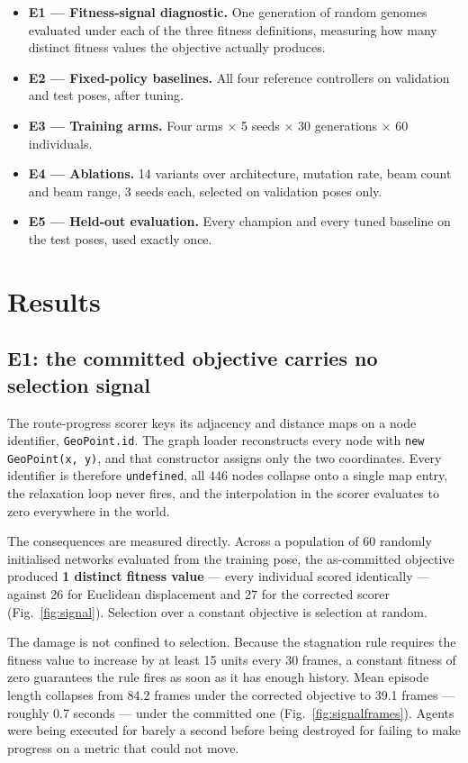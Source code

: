 \documentclass[conference]{IEEEtran}
\begin{document}
\begin{itemize}
\item \textbf{E1 — Fitness-signal diagnostic.} One generation of random genomes evaluated under each of the three fitness definitions, measuring how many distinct fitness values the objective actually produces.
\item \textbf{E2 — Fixed-policy baselines.} All four reference controllers on validation and test poses, after tuning.
\item \textbf{E3 — Training arms.} Four arms × 5 seeds × 30 generations × 60 individuals.
\item \textbf{E4 — Ablations.} 14 variants over architecture, mutation rate, beam count and beam range, 3 seeds each, selected on validation poses only.
\item \textbf{E5 — Held-out evaluation.} Every champion and every tuned baseline on the test poses, used exactly once.
\end{itemize}

\section{Results}

\label{sec:results}

\subsection{E1: the committed objective carries no selection signal}

The route-progress scorer keys its adjacency and distance maps on a node identifier, \texttt{GeoPoint.id}. The graph loader reconstructs every node with \texttt{new GeoPoint(x, y)}, and that constructor assigns only the two coordinates. Every identifier is therefore \texttt{undefined}, all 446 nodes collapse onto a single map entry, the relaxation loop never fires, and the interpolation in the scorer evaluates to zero everywhere in the world.

The consequences are measured directly. Across a population of 60 randomly initialised networks evaluated from the training pose, the as-committed objective produced \textbf{1 distinct fitness value} — every individual scored identically — against 26 for Euclidean displacement and 27 for the corrected scorer (Fig.~\ref{fig:signal}). Selection over a constant objective is selection at random.

The damage is not confined to selection. Because the stagnation rule requires the fitness value to increase by at least 15 units every 30 frames, a constant fitness of zero guarantees the rule fires as soon as it has enough history. Mean episode length collapses from 84.2 frames under the corrected objective to 39.1 frames — roughly 0.7 seconds — under the committed one (Fig.~\ref{fig:signalframes}). Agents were being executed for barely a second before being destroyed for failing to make progress on a metric that could not move.
\end{document}
